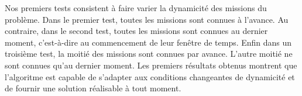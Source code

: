 \documentclass{roadef2010}
\begin{document}
Nos premiers tests consistent \`a faire varier la dynamicit\'{e} des missions du probl\`{e}me. Dans le premier test, toutes les missions sont connues \`{a} l'avance. Au contraire, dans le second test, toutes les missions sont connues au dernier moment, c'est-\`{a}-dire au commencement de leur fen\^{e}tre de temps. Enfin dans un troisi\`{e}me test, la moiti\'e des missions sont connues par avance. L'autre moiti\'{e} ne sont connues qu'au dernier moment. Les premiers r\'{e}sultats obtenus montrent que l'algoritme est capable de s'adapter aux conditions changeantes de dynamicit\'{e} et de fournir une solution r\'{e}alisable \`{a} tout moment.




\end{document}
